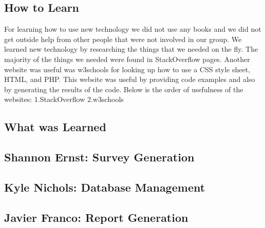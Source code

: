 \documentclass[letterpaper,10pt,serif,draftclsnofoot,onecolumn,compsoc,titlepage]{IEEEtran}
\begin{document}
\subsection{How to Learn}
For learning how to use new technology we did not use any books and we did not get outside help from other people that were not involved in our group.
We learned new technology by researching the things that we needed on the fly.
The majority of the things we needed were found in StackOverflow pages.
Another website was useful was w3schools for looking up how to use a CSS style sheet, HTML, and PHP.
This website was useful by providing code examples and also by generating the results of the code. 
Below is the order of usefulness of the websites:
1.StackOverflow
2.w3schools
\subsection{What was Learned}
\subsection{Shannon Ernst: Survey Generation}
\subsection{Kyle Nichols: Database Management}
\subsection{Javier Franco: Report Generation}

%
%
\end{document}
